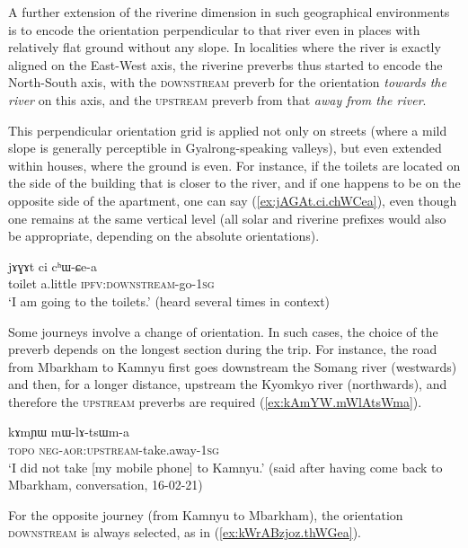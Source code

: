 A further extension of the riverine dimension in such geographical environments is to encode the orientation perpendicular to that river even in places with relatively flat ground without any slope. In localities where the river is exactly aligned on the East-West axis, the riverine preverbs thus started to encode the North-South axis, with the \textsc{downstream} preverb for the orientation \textit{towards the river} on this axis, and the \textsc{upstream} preverb from that \textit{away from the river}. %

This perpendicular orientation grid is applied not only on streets (where a mild slope is generally perceptible in Gyalrong-speaking valleys), but even extended within houses, where the ground is even. For instance, if the toilets are located on the side of the building that is closer to the river, and if one happens to be on the opposite side of the apartment, one can say (\ref{ex:jAGAt.ci.chWCea}), even though one remains at the same vertical level (all solar and riverine prefixes would also be appropriate, depending on the absolute orientations).

 \begin{exe}
\ex \label{ex:jAGAt.ci.chWCea}
\gll  jɤɣɤt ci cʰɯ-ɕe-a \\
toilet a.little \textsc{ipfv}:\textsc{downstream}-go-\textsc{1sg} \\
\glt `I am going to the toilets.' (heard several times in context)
\end{exe}
 
Some journeys involve a change of orientation. In such cases, the choice of the preverb depends on the longest section during the trip. For instance, the road from Mbarkham to Kamnyu first goes downstream the Somang river (westwards) and then, for a longer distance, upstream the Kyomkyo river (northwards), and therefore the \textsc{upstream} preverbs are required (\ref{ex:kAmYW.mWlAtsWma}). 

 \begin{exe}
\ex \label{ex:kAmYW.mWlAtsWma}
\gll kɤmɲɯ mɯ-lɤ-tsɯm-a \\
\textsc{topo} \textsc{neg}-\textsc{aor}:\textsc{upstream}-take.away-\textsc{1sg} \\
\glt `I did not take  [my mobile phone] to Kamnyu.' (said after having come back to Mbarkham, conversation, 16-02-21)
\end{exe}

For the opposite journey (from Kamnyu to Mbarkham), the orientation \textsc{downstream} is always selected, as in (\ref{ex:kWrABzjoz.thWGea}).

